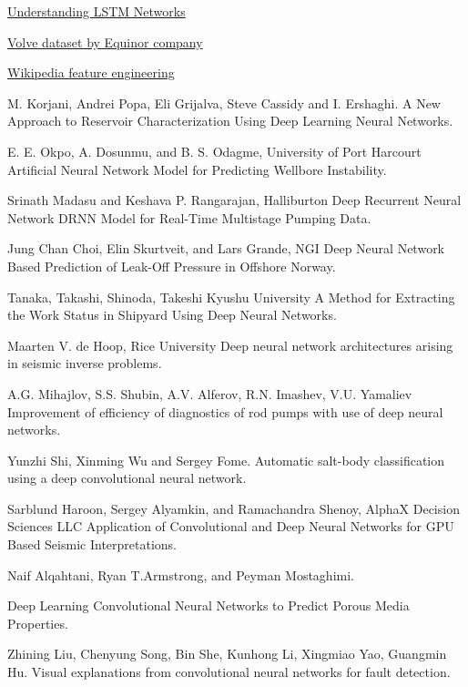 \documentclass[12pt,a4paper]{report}
\begin{document}
\begin{thebibliography}{1}
\href{https://colah.github.io/posts/2015-08-Understanding-LSTMs/}{Understanding LSTM Networks}

\href{https://www.equinor.com/en/news/14jun2018-disclosing-volve-data.html}{Volve dataset by Equinor company}

\href{https://en.wikipedia.org/wiki/Feature_engineering}{Wikipedia feature engineering}

M. Korjani, Andrei Popa, Eli Grijalva, Steve Cassidy and I. Ershaghi.
\newblock A New Approach to Reservoir Characterization Using Deep Learning Neural Networks.

E. E. Okpo, A. Dosunmu, and B. S. Odagme, University of Port Harcourt
\newblock Artificial Neural Network Model for Predicting Wellbore Instability.

Srinath Madasu and Keshava P. Rangarajan, Halliburton
\newblock Deep Recurrent Neural Network DRNN Model for Real-Time Multistage Pumping Data.

Jung Chan Choi, Elin Skurtveit, and Lars Grande, NGI
\newblock Deep Neural Network Based Prediction of Leak-Off Pressure in Offshore Norway.

Tanaka, Takashi, Shinoda, Takeshi Kyushu University
\newblock A Method for Extracting the Work Status in Shipyard Using Deep Neural Networks.

Maarten V. de Hoop, Rice University
\newblock Deep neural network architectures arising in seismic inverse problems.

A.G. Mihajlov, S.S. Shubin, A.V. Alferov, R.N. Imashev, V.U. Yamaliev
\newblock Improvement of efficiency of diagnostics of rod pumps with use of deep neural networks.

Yunzhi Shi, Xinming Wu and Sergey Fome.
\newblock Automatic salt-body classification using a deep convolutional neural network.

Sarblund Haroon, Sergey Alyamkin, and Ramachandra Shenoy, AlphaX Decision Sciences LLC
\newblock Application of Convolutional and Deep Neural Networks for GPU Based Seismic Interpretations.

Naif Alqahtani, Ryan T.Armstrong, and Peyman Mostaghimi.

\newblock Deep Learning Convolutional Neural Networks to Predict Porous Media Properties.

Zhining Liu, Chenyung Song, Bin She, Kunhong Li, Xingmiao Yao, Guangmin Hu.
\newblock Visual explanations from convolutional neural networks for fault detection.


\end{thebibliography}
\end{document}
